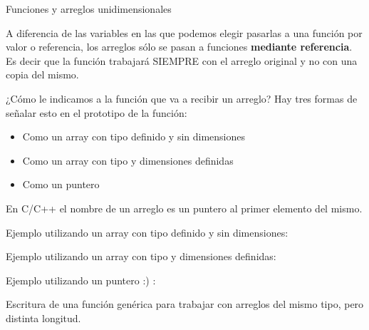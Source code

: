 \documentclass[xcolor=pdftex,table,11pt]{beamer}
\begin{document}
\begin{frame}[allowframebreaks]{Funciones y arreglos unidimensionales}
\begin{block}{}
A diferencia de las variables en las que podemos elegir pasarlas a una función por valor o referencia, los arreglos sólo se pasan a funciones \textbf{mediante referencia}.\\
Es decir que la función trabajará SIEMPRE con el arreglo original y no con una copia del mismo.
\end{block}


\begin{block}{¿Cómo le indicamos a la función que va a recibir un arreglo?}
Hay tres formas de señalar esto en el prototipo de la función:
\begin{itemize}
\item Como un array con tipo definido y sin dimensiones
\item Como un array con tipo y dimensiones definidas
\item Como un puntero

\end{itemize}


\end{block}
En C/C++ el nombre de un arreglo es un puntero al primer elemento del mismo.


\newpage
Ejemplo utilizando un array con tipo definido y sin dimensiones:
\codesetstylefrombeamer
{}

\href{https://github.com/danis963/informaticaI_IUA/blob/main/c/src/7-func_array_1d.c}{}

\newpage
Ejemplo utilizando un array con tipo y dimensiones definidas:
\codesetstylefrombeamer
{}

\href{https://github.com/danis963/informaticaI_IUA/blob/main/c/src/7-2func_array_1d.c}{}



\newpage
Ejemplo utilizando un puntero :) :
\codesetstylefrombeamer
{}


\newpage

\begin{block}{}
Escritura de una función genérica para trabajar con arreglos del mismo tipo, pero distinta longitud.

\end{block}


\codesetstylefrombeamer
{}

\href{https://github.com/danis963/informaticaI_IUA/blob/main/c/src/7-3func_array_1d_tam.c}{}
\end{frame}
\end{document}
